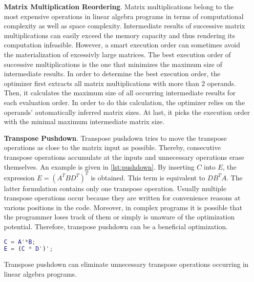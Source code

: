 \textbf{Matrix Multiplication Reordering}. Matrix multiplications belong to the most expensive operations in linear algebra programs in terms of computational complexity as well as space complexity. Intermediate results of successive matrix multiplications can easily exceed the memory capacity and thus rendering its computation infeasible. However, a smart execution order can sometimes avoid the materialization of excessivly large matrices. The best execution order of successive multiplications is the one that minimizes the maximum size of intermediate results.
In order to determine the best execution order, the optimizer first extracts all matrix multiplications with more than $2$ operands.
Then, it calculates the maximum size of all occurring intermediate results for each evaluation order.
In order to do this calculation, the optimizer relies on the operands' automatically inferred matrix sizes.%
At last, it picks the execution order with the minimal maximum intermediate matrix size.


\textbf{Transpose Pushdown}. Transpose pushdown tries to move the transpose operations as close to the matrix input as possible.
Thereby, consecutive transpose operations accumulate at the inputs and unnecessary operations erase themselves.
An example is given in \cref{lst:pushdown}. By inserting $C$ into $E$, the expression $E=(A^T BD^T)^T$ is obtained. This term is equivalent to $DB^T A$. The latter formulation contains only one transpose operation. Usually multiple transpose operations occur because they are written for convenience reasons at various positions in the code. Moreover, in complex programs it is possible that the programmer loses track of them or simply is unaware of the optimization potential. Therefore, transpose pushdown can be a beneficial optimization.

\begin{listing}[!h]
  \begin{CenteredBox}
    \begin{lstlisting}[language=Matlab]
C = A'*B;
E = (C * D')';
    \end{lstlisting}
  \end{CenteredBox}
  \caption{Transpose pushdown can eliminate unnecessary transpose operations occurring in linear algebra programs.}
  \label{lst:pushdown}
\end{listing}

